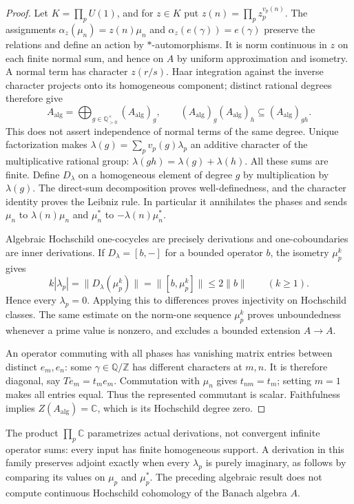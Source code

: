 \begin{proof}
Let \(K=\prod_p U(1)\), and for \(z\in K\) put
\(z(n)=\prod_p z_p^{v_p(n)}\).
The assignments \(\alpha_z(\mu_n)=z(n)\mu_n\) and
\(\alpha_z(e(\gamma))=e(\gamma)\) preserve the relations and define
an action by \(*\)-automorphisms. It is norm continuous in \(z\)
on each finite normal sum, and hence on \(A\) by uniform
approximation and isometry. A normal term has character \(z(r/s)\).
Haar integration against the inverse character projects onto its
homogeneous component; distinct rational degrees therefore give
\[
 A_{\mathrm{alg}}=\bigoplus_{g\in\mathbb Q_{>0}^{\times}}
 (A_{\mathrm{alg}})_g,
 \qquad (A_{\mathrm{alg}})_g(A_{\mathrm{alg}})_h
 \subseteq(A_{\mathrm{alg}})_{gh}.
\]
This does not assert independence of normal terms of the same degree.
Unique factorization makes
\(\lambda(g)=\sum_pv_p(g)\lambda_p\) an additive character of the
multiplicative rational group: \(\lambda(gh)=\lambda(g)+\lambda(h)\).
All these sums are finite. Define \(D_\lambda\) on a homogeneous
element of degree \(g\) by multiplication by \(\lambda(g)\).
The direct-sum decomposition proves well-definedness, and the character
identity proves the Leibniz rule. In particular it annihilates the
phases and sends \(\mu_n\) to \(\lambda(n)\mu_n\) and
\(\mu_n^*\) to \(-\lambda(n)\mu_n^*\).

Algebraic Hochschild one-cocycles are precisely derivations and
one-coboundaries are inner derivations. If \(D_\lambda=[b,-]\)
for a bounded operator \(b\), the isometry \(\mu_p^k\) gives
\[
 k|\lambda_p|=\|D_\lambda(\mu_p^k)\|
 =\|[b,\mu_p^k]\|\le2\|b\|\qquad(k\ge1).
\]
Hence every \(\lambda_p=0\). Applying this to differences proves
injectivity on Hochschild classes. The same estimate on the
norm-one sequence \(\mu_p^k\) proves unboundedness whenever a
prime value is nonzero, and excludes a bounded extension \(A\to A\).

An operator commuting with all phases has vanishing matrix entries
between distinct \(e_m,e_n\): some \(\gamma\in\mathbb Q/\mathbb Z\)
has different characters at \(m,n\). It is therefore diagonal,
say \(Te_m=t_me_m\). Commutation with \(\mu_n\) gives
\(t_{nm}=t_m\); setting \(m=1\) makes all entries equal.
Thus the represented commutant is scalar. Faithfulness implies
\(Z(A_{\mathrm{alg}})=\mathbb C\), which is its Hochschild degree zero.
\end{proof}

The product \(\prod_p\mathbb C\) parametrizes actual derivations,
not convergent infinite operator sums: every input has finite
homogeneous support. A derivation in this family preserves adjoint
exactly when every \(\lambda_p\) is purely imaginary, as follows
by comparing its values on \(\mu_p\) and \(\mu_p^*\).
The preceding algebraic result does not compute continuous
Hochschild cohomology of the Banach algebra \(A\).

